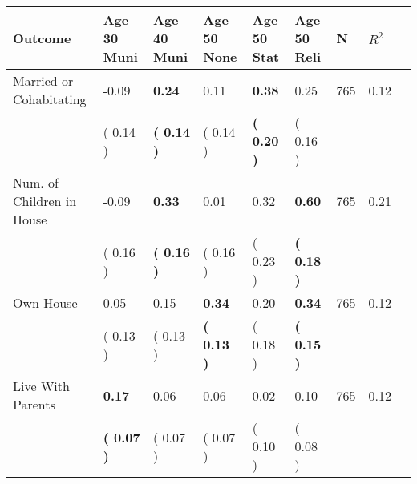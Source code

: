 \begin{tabular}{L{6.2cm} C{1.8cm} C{1.8cm} C{1.8cm} C{1.8cm} C{1.8cm} C{1.8cm} C{0.3cm} C{0.3cm}}
\toprule
 \textbf{Outcome} & \textbf{Age 30 Muni} & \textbf{Age 40 Muni} & \textbf{Age 50 None} & \textbf{Age 50 Stat} & \textbf{Age 50 Reli} & \textbf{N} & \textbf{$ R^2$} \\
\midrule
Married or Cohabitating &     -0.09 & \textbf{     0.24} &      0.11 & \textbf{     0.38} &      0.25  & 765 &       0.12 \\ 
 & (     0.14 ) & \textbf{(     0.14 )} & (     0.14 ) & \textbf{(     0.20 )} & (     0.16 )  & \\
Num. of Children in House &     -0.09 & \textbf{     0.33} &      0.01 &      0.32 & \textbf{     0.60}  & 765 &       0.21 \\ 
 & (     0.16 ) & \textbf{(     0.16 )} & (     0.16 ) & (     0.23 ) & \textbf{(     0.18 )}  & \\
Own House &      0.05 &      0.15 & \textbf{     0.34} &      0.20 & \textbf{     0.34}  & 765 &       0.12 \\ 
 & (     0.13 ) & (     0.13 ) & \textbf{(     0.13 )} & (     0.18 ) & \textbf{(     0.15 )}  & \\
Live With Parents & \textbf{     0.17} &      0.06 &      0.06 &      0.02 &      0.10  & 765 &       0.12 \\ 
 & \textbf{(     0.07 )} & (     0.07 ) & (     0.07 ) & (     0.10 ) & (     0.08 )  & \\
\bottomrule
\end{tabular}
